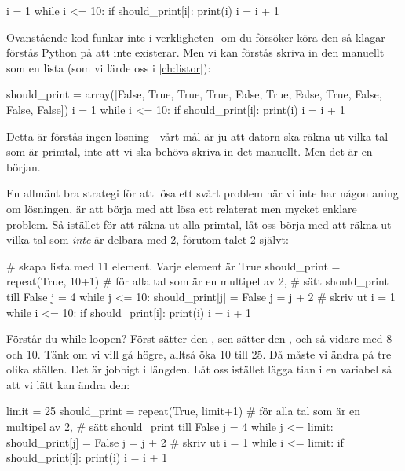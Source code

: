 \vspace{10pt}
\begin{python}
i = 1
while i <= 10:
	if should_print[i]:
		print(i)
	i = i + 1
\end{python}

Ovanstående kod funkar inte i verkligheten- om du försöker köra den så klagar förstås Python på att  inte existerar. Men vi kan förstås skriva in den manuellt som en lista (som vi lärde oss i \autoref{ch:listor}):
\vspace{10pt}

\begin{python}
should_print = array([False, True, True, True, False, True, False, True, False, False, False])
i = 1
while i <= 10:
	if should_print[i]:
		print(i)
	i = i + 1
\end{python}

Detta är förstås ingen lösning - vårt mål är ju att datorn ska räkna ut vilka tal som är primtal, inte att vi ska behöva skriva in det manuellt. Men det är en början.

En allmänt bra strategi för att lösa ett svårt problem när vi inte har någon aning om lösningen, är att börja med att lösa ett relaterat men mycket enklare problem. Så istället för att räkna ut alla primtal, låt oss börja med att räkna ut vilka tal som \emph{inte} är delbara med 2, förutom talet 2 självt:
\vspace{10pt}

\begin{python}
# skapa lista med 11 element. Varje element är True
should_print = repeat(True, 10+1)
# för alla tal som är en multipel av 2,
# sätt should_print till False
j = 4
while j <= 10:
	should_print[j] = False
	j = j + 2
# skriv ut
i = 1
while i <= 10:
	if should_print[i]:
		print(i)
	i = i + 1
\end{python}

Förstår du while-loopen? Först sätter den , sen sätter den , och så vidare med 8 och 10.
\newpage
Tänk om vi vill gå högre, alltså öka 10 till 25. Då måste vi ändra på tre olika ställen. Det är jobbigt i längden. Låt oss istället lägga tian i en variabel så att vi lätt kan ändra den:
\vspace{10pt}

\begin{python}
limit = 25
should_print = repeat(True, limit+1)
# för alla tal som är en multipel av 2,
# sätt should_print till False
j = 4
while j <= limit:
	should_print[j] = False
	j = j + 2
# skriv ut
i = 1
while i <= limit:
	if should_print[i]:
		print(i)
	i = i + 1
\end{python}


